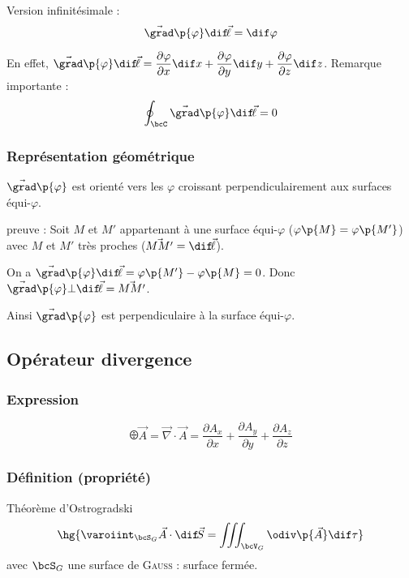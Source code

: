     Version infinitésimale :
    \[ \vec{\grad}\p{\varphi} \dif\!\Vec{\ell} = \dif \varphi\]
    
    En effet, $\vec{\grad}\p{\varphi} \dif\!\Vec{\ell} = \dfrac{\partial \varphi}{\partial x}\dif x + \dfrac{\partial \varphi}{\partial y}\dif y +
    \dfrac{\partial \varphi}{\partial z}\dif z$. Remarque importante :
    \[ \oint_\bcC \vec{\grad}\p{\varphi} \dif\!\Vec{\ell} = 0\]
    
    \subsubsection{Représentation géométrique}
    
    $\Vec{\grad}\p{\varphi}$ est orienté vers les $\varphi$ croissant perpendiculairement aux surfaces équi-$\varphi$.
    
    preuve : Soit $M$ et $M'$ appartenant à une surface équi-$\varphi$ ($\varphi\p{M} = \varphi\p{M'}$) avec $M$ et $M'$ très proches ($\vec{MM'} = \dif\!\vec{\ell}$).
    
    On a $\vec{\grad}\p{\varphi} \dif\!\Vec{\ell} = \varphi\p{M'} - \varphi\p{M} = 0$. Donc $\vec{\grad}\p{\varphi} \bot \dif\!\vec{\ell} = \vec{MM'}$.
    
    Ainsi $\vec{\grad}\p{\varphi}$ est perpendiculaire à la surface équi-$\varphi$.
    
    \subsection{Opérateur divergence} 
    
    \subsubsection{Expression}
    \[ \odiv \vec{A} = \vec{\nabla} \cdot \vec{A} = \dfrac{\partial A_x}{\partial x} + \dfrac{\partial A_y}{\partial y} + \dfrac{\partial A_z}{\partial z}\]
    
    \subsubsection{Définition (propriété)}
    
    \begin{theorem}{Théorème d'Ostrogradski}{}
        \[ \hg{\varoiint_{\bcS_G} \vec{A} \cdot \dif\!\vec{S} = \iiint_{\bcV_G} \odiv\p{\vec{A}} \dif \tau}\]
        avec $\bcS_G$ une surface de \textsc{Gauss} : surface fermée.
    \end{theorem}
    

